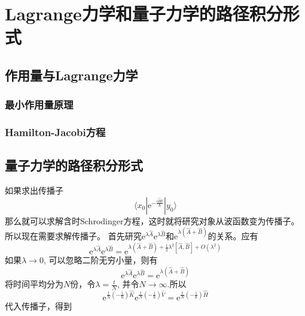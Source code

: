 \chapter{Lagrange力学和量子力学的路径积分形式}
    \section{作用量与Lagrange力学}
        \subsection{最小作用量原理}
        \subsection{Hamilton-Jacobi方程}
    \section{量子力学的路径积分形式}
        如果求出传播子
        \begin{equation*}
            \langle x_0 | \mathrm{e}^{-\frac {\mathrm{i}\hat{H}t}{\hbar}} | y_0 \rangle
        \end{equation*}
        那么就可以求解含时Schrodinger方程，这时就将研究对象从波函数变为传播子。所以现在需要求解传播子。
        首先研究$\mathrm{e}^{\lambda \hat{A}}\mathrm{e}^{\lambda \hat{B}}$和$\mathrm{e}^{\lambda (\hat{A}+\hat{B})}$的关系。应有
        \begin{equation*}
            \mathrm{e}^{\lambda \hat{A}} \mathrm{e}^{\lambda \hat{B}} = \mathrm{e}^{\lambda (\hat{A}+\hat{B}) + \frac 12 \lambda^2 [\hat{A},\hat{B}] + O(\lambda^2)}
        \end{equation*}
        如果$\lambda \to 0$, 可以忽略二阶无穷小量，则有
        \begin{equation*}
            \mathrm{e}^{\lambda \hat{A}} \mathrm{e}^{\lambda \hat{B}} = \mathrm{e}^{\lambda (\hat{A}+\hat{B})}
        \end{equation*}
        将时间平均分为$N$份，令$\lambda = \frac tN$, 并令$N \to \infty$.所以
        \begin{equation*}
            \mathrm{e}^{\frac tN (-\frac {\mathrm{i}}{\hbar}) \hat{K}} \mathrm{e}^{\frac tN (-\frac {\mathrm{i}}{\hbar}) \hat{V}} =\mathrm{e}^{\frac tN (-\frac {\mathrm{i}}{\hbar}) \hat{H}} 
        \end{equation*}
        代入传播子，得到
